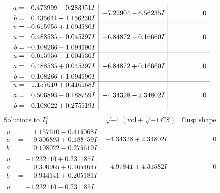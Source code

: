 \documentclass[1p]{elsarticle_modified}
\theoremstyle{definition}
\newcommand{\I}{\sqrt{-1}}
\begin{document}
$$\begin{array}{c|c|c}
\begin{aligned}
a &= -0.473999 - 0.283951 I \\
b &= \phantom{-}0.435641 - 1.156230 I\end{aligned}
 & -7.22904 - 6.56235 I & \phantom{-0.000000 } 0 \\ \hline\begin{aligned}
u &= -0.615956 + 1.004530 I \\
a &= \phantom{-}0.488535 - 0.045297 I \\
b &= -0.108266 - 1.094690 I\end{aligned}
 & -6.84872 - 0.16660 I & \phantom{-0.000000 } 0 \\ \hline\begin{aligned}
u &= -0.615956 - 1.004530 I \\
a &= \phantom{-}0.488535 + 0.045297 I \\
b &= -0.108266 + 1.094690 I\end{aligned}
 & -6.84872 + 0.16660 I & \phantom{-0.000000 } 0 \\ \hline\begin{aligned}
u &= \phantom{-}1.157610 + 0.416068 I \\
a &= \phantom{-}0.506893 - 0.188759 I \\
b &= \phantom{-}0.108022 + 0.275619 I\end{aligned}
 & -4.34328 - 2.34802 I & \phantom{-0.000000 } 0\\
 \hline 
 \end{array}$$\newpage$$\begin{array}{c|c|c}  
\text{Solutions to }I^u_{1}& \I (\text{vol} + \sqrt{-1}CS) & \text{Cusp shape}\\
 \hline 
\begin{aligned}
u &= \phantom{-}1.157610 - 0.416068 I \\
a &= \phantom{-}0.506893 + 0.188759 I \\
b &= \phantom{-}0.108022 - 0.275619 I\end{aligned}
 & -4.34328 + 2.34802 I & \phantom{-0.000000 } 0 \\ \hline\begin{aligned}
u &= -1.232110 + 0.231185 I \\
a &= \phantom{-}0.300965 + 0.165464 I \\
b &= \phantom{-}0.944141 + 0.205181 I\end{aligned}
 & -4.97841 + 4.31582 I & \phantom{-0.000000 } 0 \\ \hline\begin{aligned}
u &= -1.232110 - 0.231185 I \\

\end{aligned}
\end{array}$$
\end{document}
